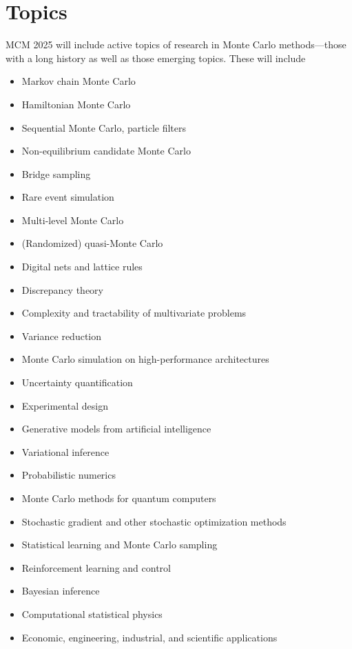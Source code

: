 \documentclass{article}
\newcommand{\ny}[1]{{\color{brown}Yiou: #1}}
\begin{document}
\section{Topics}
MCM 2025 will include active topics of research in Monte Carlo methods---those with a long history as well as those emerging topics.  These will include
\begin{itemize}
\item Markov chain Monte Carlo
\item Hamiltonian Monte Carlo
\item Sequential Monte Carlo, particle filters
\item Non-equilibrium candidate Monte Carlo
\item Bridge sampling
\item Rare event simulation
\item Multi-level Monte Carlo
\item (Randomized) quasi-Monte Carlo
\item Digital nets and lattice rules
\item Discrepancy theory
\item Complexity and tractability of multivariate problems
\item Variance reduction
\item Monte Carlo simulation on high-performance architectures
\item Uncertainty quantification
\item Experimental design
\item Generative models from artificial intelligence
\item Variational inference
\item Probabilistic numerics
\item Monte Carlo methods for quantum computers
\item Stochastic gradient and other stochastic optimization methods
\item Statistical learning and Monte Carlo sampling
\item Reinforcement learning and control
\item Bayesian inference
\item Computational statistical physics
\item Economic, engineering, industrial, and scientific applications
\end{itemize}

\end{document}
